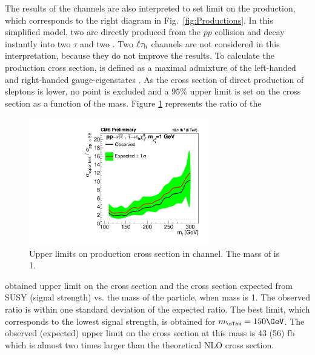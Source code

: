 The results of the \tauTau channels are also interpreted to set limit on the  \sTau\sTau production, 
which corresponds to the right diagram in Fig.~\ref{fig:Productions}. 
In this simplified model, two \sTau are directly produced from the $pp$ collision and decay instantly 
into two $\tau$ and two \PSGczDo. 
Two $\ell\tau_{\rm h}$ channels are not considered in this interpretation, because they do not improve the results. 
To calculate the production cross section, \sTau is 
defined as a maximal admixture of the left-handed and right-handed \sTau gauge-eigenstates \cite{Fuks:2013lya}. 
As the cross section of direct production of sleptons is lower, no point is excluded and a $95\%$ upper limit is set on 
the cross section  as a function of the \sTau mass. 
Figure \ref{fig:limit_stau_stau} represents the ratio of the 
\begin{linenomath}
\begin{figure}[!htb]
\centering
\includegraphics[width=0.7\textwidth,keepaspectratio=true]{StatisticsFig/ExclusionSTauSTauLsp1.pdf}
\caption{Upper limits on \sTau\sTau production cross section in \tauTau channel. The mass of \PSGczDo is 1\GeV.}
\label{fig:limit_stau_stau}
\end{figure}
\end{linenomath}
obtained upper limit on the cross section and the cross section expected from SUSY (signal strength) vs. the mass of the \sTau particle, when \PSGczDo mass is 1\GeV.
The observed ratio is within one standard deviation of  the expected ratio.
The best limit, which corresponds to the lowest signal strength, is obtained for $m_{\sTau}=150\GeV$. The observed (expected) upper limit on the cross section at this mass is 43 (56) fb which is almost two  times larger than the theoretical NLO cross section.



